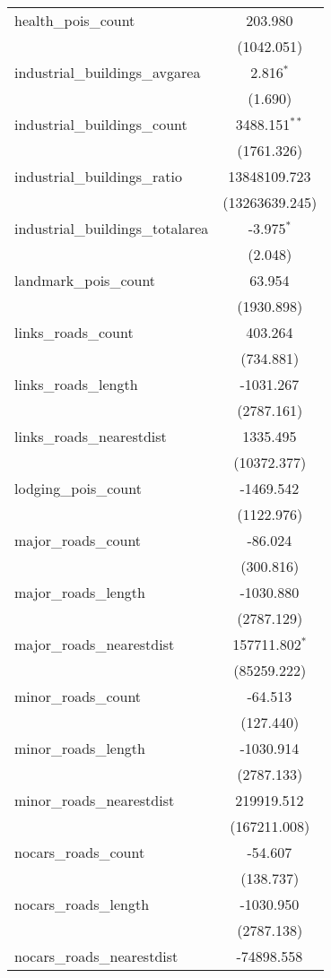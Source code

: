\begin{table}[!htbp]
\begin{tabular}{@{\extracolsep{5pt}}lc}
 health_pois_count & 203.980$^{}$ \\
  & (1042.051) \\
 industrial_buildings_avgarea & 2.816$^{*}$ \\
  & (1.690) \\
 industrial_buildings_count & 3488.151$^{**}$ \\
  & (1761.326) \\
 industrial_buildings_ratio & 13848109.723$^{}$ \\
  & (13263639.245) \\
 industrial_buildings_totalarea & -3.975$^{*}$ \\
  & (2.048) \\
 landmark_pois_count & 63.954$^{}$ \\
  & (1930.898) \\
 links_roads_count & 403.264$^{}$ \\
  & (734.881) \\
 links_roads_length & -1031.267$^{}$ \\
  & (2787.161) \\
 links_roads_nearestdist & 1335.495$^{}$ \\
  & (10372.377) \\
 lodging_pois_count & -1469.542$^{}$ \\
  & (1122.976) \\
 major_roads_count & -86.024$^{}$ \\
  & (300.816) \\
 major_roads_length & -1030.880$^{}$ \\
  & (2787.129) \\
 major_roads_nearestdist & 157711.802$^{*}$ \\
  & (85259.222) \\
 minor_roads_count & -64.513$^{}$ \\
  & (127.440) \\
 minor_roads_length & -1030.914$^{}$ \\
  & (2787.133) \\
 minor_roads_nearestdist & 219919.512$^{}$ \\
  & (167211.008) \\
 nocars_roads_count & -54.607$^{}$ \\
  & (138.737) \\
 nocars_roads_length & -1030.950$^{}$ \\
  & (2787.138) \\
 nocars_roads_nearestdist & -74898.558$^{}$ \\

\end{tabular}
\end{table}

